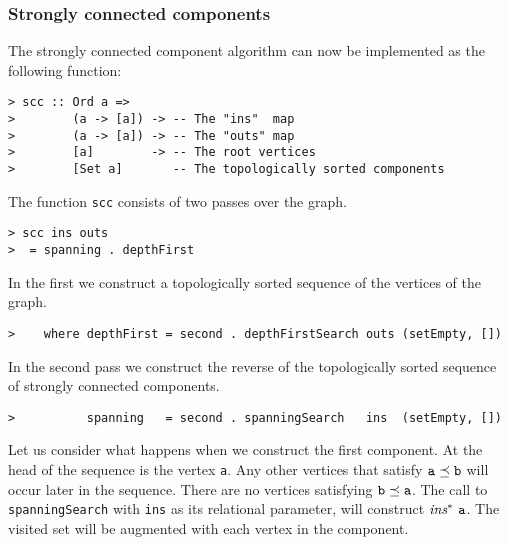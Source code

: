 \subsubsection{Strongly connected components}

The strongly connected component algorithm can now be implemented as the
following function:
\begin{verbatim}
> scc :: Ord a =>
>        (a -> [a]) -> -- The "ins"  map
>        (a -> [a]) -> -- The "outs" map
>        [a]        -> -- The root vertices
>        [Set a]       -- The topologically sorted components
\end{verbatim}
%
\par
The function \mbox{\tt scc} consists of two passes over the graph.
\begin{verbatim}
> scc ins outs
>  = spanning . depthFirst
\end{verbatim}
%
In the first we construct a topologically sorted sequence of the
vertices of the graph.
\begin{verbatim}
>    where depthFirst = second . depthFirstSearch outs (setEmpty, [])
\end{verbatim}
In the second pass we construct the reverse of the topologically
sorted sequence of strongly connected components.
\begin{verbatim}
>          spanning   = second . spanningSearch   ins  (setEmpty, [])
\end{verbatim}
\par
Let us consider what happens when we construct the first component. At
the head of the sequence is the vertex \mbox{\tt a}. Any other vertices that
satisfy $\mbox{\tt a} \preceq \mbox{\tt b}$ will occur later in the sequence. There are
no vertices satisfying $\mbox{\tt b} \preceq \mbox{\tt a}$.  The call to
\mbox{\tt spanningSearch} with \mbox{\tt ins} as its relational parameter, will
construct $\mbox{\it ins}^\ast ~ \mbox{\tt a}$. The visited set will be
augmented with each vertex in the component.

